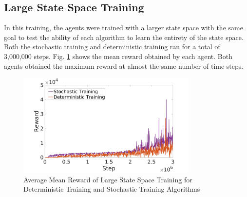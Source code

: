  \subsection{Large State Space Training}
In this training, the agents were trained with a larger state space with the same goal to test the ability of each algorithm to learn the entirety of the state space. Both the stochastic training and deterministic training ran for a total of 3,000,000 steps. Fig. \ref{SvT2.5} shows the mean reward obtained by each agent. Both agents obtained the maximum reward at almost the same number of time steps.
\begin{figure}[H]
            \centering
            \includegraphics[width=0.8\textwidth]{plots/SACvsTD3_2_5.jpg}
            \caption{Average Mean Reward of Large State Space Training for Deterministic Training and Stochastic Training Algorithms}
            \label{SvT2.5}
    \end{figure}\clearpage

